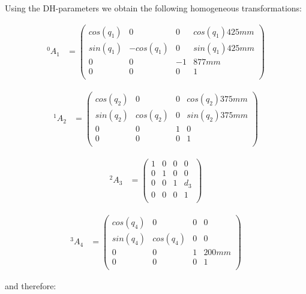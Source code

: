 Using the DH-parameters we obtain the following homogeneous transformations:

\begin{align*}
^0A_1 &= 
\begin{pmatrix}
cos(q_1) & 0 & 0 & cos(q_1)425mm \\
sin(q_1) & -cos(q_1) & 0 & sin(q_1)425mm \\
0 & 0 & -1 & 877mm \\
0 & 0 & 0 & 1 \\
\end{pmatrix}
\end{align*}

\begin{align*}
^1A_2 &= 
\begin{pmatrix}
cos(q_2) & 0 & 0 & cos(q_2)375mm \\
sin(q_2) & cos(q_2) & 0 & sin(q_2)375mm \\
0 & 0 & 1 & 0 \\
0 & 0 & 0 & 1 \\
\end{pmatrix}
\end{align*}

\begin{align*}
^2A_3 &= 
\begin{pmatrix}
1 & 0 & 0 & 0 \\
0 & 1 & 0 & 0 \\
0 & 0 & 1 & d_3 \\
0 & 0 & 0 & 1 \\
\end{pmatrix}
\end{align*}

\begin{align*}
^3A_4 &= 
\begin{pmatrix}
cos(q_4) & 0 & 0 & 0 \\
sin(q_4) & cos(q_4) & 0 & 0 \\
0 & 0 & 1 & 200mm \\
0 & 0 & 0 & 1 \\
\end{pmatrix}
\end{align*}

and therefore:

